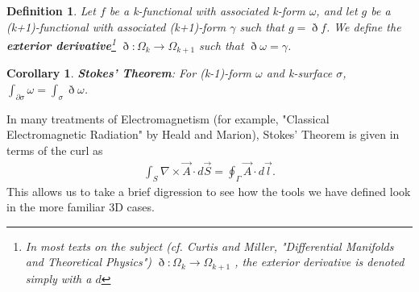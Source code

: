 \documentclass{book}
\newtheorem{defn}[equation]{Definition}
\newtheorem{coro}[equation]{Corollary}
\begin{document}
\begin{defn}
	Let $f$ be a k-functional with associated k-form $\omega$, and let $g$ be a (k+1)-functional with associated (k+1)-form $\gamma$ such that $g = \eth f$. We define the \textbf{exterior derivative}\footnote{In most texts on the subject (cf. Curtis and Miller, "Differential Manifolds and Theoretical Physics") $\eth : \Omega_k \to \Omega_{k+1}$ , the exterior derivative is denoted simply with a $d$} $\eth : \Omega_k \to \Omega_{k+1}$ such that $\eth\omega = \gamma$.
\end{defn}




 
 
 
 
 
 




\begin{center}
\end{center}





\begin{coro}
	\textbf{Stokes' Theorem}: For (k-1)-form $\omega$ and k-surface $\sigma$, $\int_{\partial \sigma}\omega = \int_{\sigma}\eth\omega$. 
\end{coro}

In many treatments of Electromagnetism (for example, "Classical Electromagnetic Radiation" by Heald and Marion), Stokes' Theorem is given in terms of the curl as \begin{gather}\int_S \nabla \times \vec{A} \cdot d\vec{S} = \oint_{\Gamma} \vec{A} \cdot d\vec{l}.\end{gather} This allows us to take a brief digression to see how the tools we have defined look in the more familiar 3D cases. 
\end{document}

